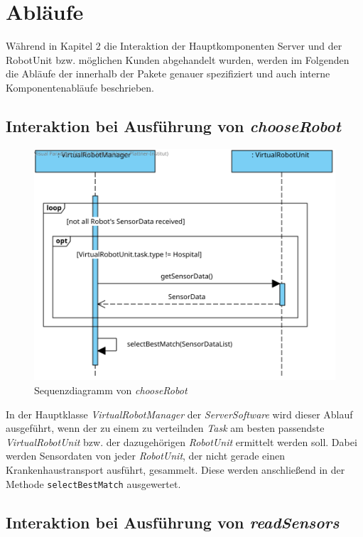 \section{Abläufe}

Während in Kapitel 2 die Interaktion der Hauptkomponenten Server und der RobotUnit bzw. möglichen Kunden abgehandelt wurden, werden im Folgenden die Abläufe der innerhalb der Pakete genauer spezifiziert und auch interne Komponentenabläufe beschrieben.

\subsection*{Interaktion bei Ausführung von \textit{chooseRobot}}


\begin{figure}[H]
	\centering
	\includegraphics[width=1\textwidth]{img/8-chooseRobot}
	\caption{Sequenzdiagramm von \emph{chooseRobot}}
	\label{chooseRobotInteraktion}
\end{figure}
In der Hauptklasse \textit{VirtualRobotManager} der \textit{ServerSoftware} wird dieser Ablauf ausgeführt, wenn der zu einem zu verteilnden \textit{Task} am besten passendste \textit{VirtualRobotUnit} bzw. der dazugehörigen \textit{RobotUnit} ermittelt werden soll. Dabei werden Sensordaten von jeder \textit{RobotUnit}, der nicht gerade einen Krankenhaustransport ausführt, gesammelt. Diese werden anschließend in der Methode \texttt{selectBestMatch} ausgewertet.
\\

\subsection*{Interaktion bei Ausführung von \textit{readSensors}}


